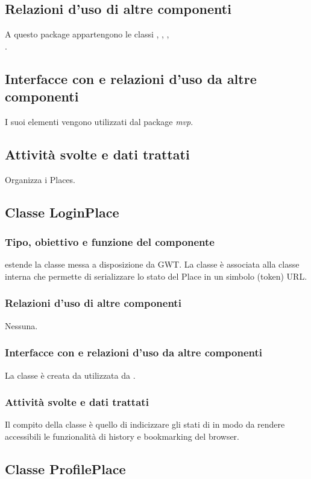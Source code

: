 \subsection*{Relazioni d'uso di altre componenti}
A questo package appartengono le classi , ,
, \\.
\subsection*{Interfacce con e relazioni d'uso da altre componenti}
 I suoi elementi vengono utilizzati dal package \emph{mvp}.
\subsection*{Attivit\`a svolte e dati trattati}
Organizza i Places.

\subsection{Classe LoginPlace}
\subsubsection*{Tipo, obiettivo e funzione del componente}
 estende la classe  messa a disposizione da GWT. La
classe \`e associata alla classe interna  che permette di
serializzare lo stato del Place in un simbolo (token) URL.
\subsubsection*{Relazioni d'uso di altre componenti}
Nessuna.
\subsubsection*{Interfacce con e relazioni d'uso da altre componenti}
La classe \`e creata da  utilizzata da .
\subsubsection*{Attivit\`a svolte e dati trattati}
Il compito della classe \`e quello di indicizzare gli stati di
 in modo da rendere accessibili le funzionalit\`a di history e
bookmarking del browser.

\subsection{Classe ProfilePlace}
